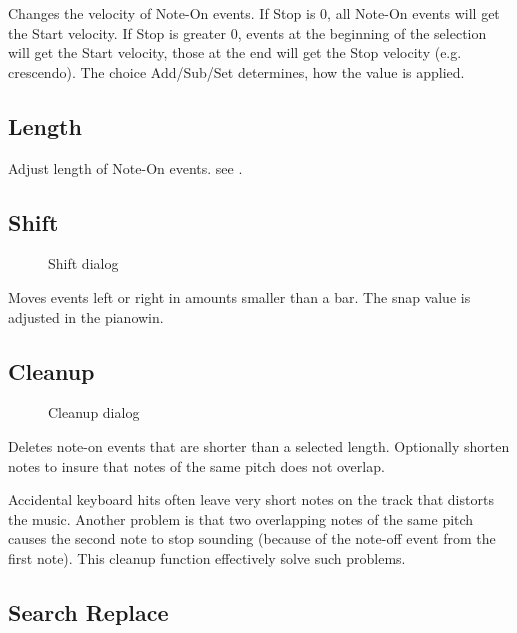 \documentclass[letterpaper]{report}
\begin{document}
Changes the velocity of Note-On events. If Stop is 0, all Note-On events will get
the Start velocity. If Stop is greater 0, events at the beginning of the selection
will get the Start velocity, those at the end will get the Stop velocity
(e.g. crescendo). The choice Add/Sub/Set determines, how the value is applied.


\subsection{Length}\label{length}

Adjust length of Note-On events. see .


\subsection{Shift}\label{shift}

\begin{figure}%
%
%
\caption{Shift dialog}%
\end{figure}

Moves events left or right in amounts smaller than a bar. The snap value is
adjusted in the pianowin.

\subsection{Cleanup}\label{cleanup}

\begin{figure}%
%
%
\caption{Cleanup dialog}%
\end{figure}

Deletes note-on events that are shorter than a selected length. Optionally
shorten notes to insure that notes of the same pitch does not overlap.

Accidental keyboard hits often leave very short notes on the track that
distorts the music. Another problem is that two overlapping notes of the
same pitch causes the second note to stop sounding (because of the note-off
event from the first note). This cleanup function effectively solve such
problems.

\subsection{Search Replace}\label{search}
\end{document}
